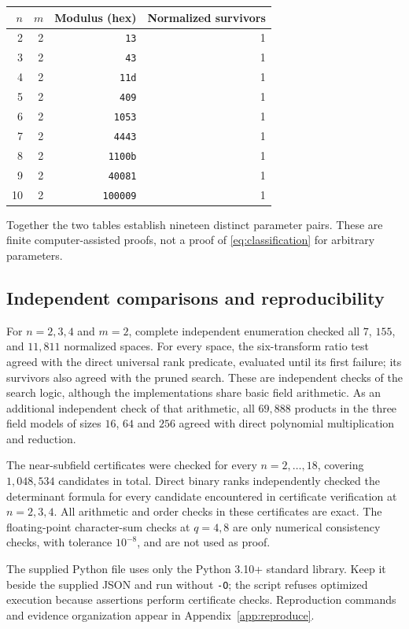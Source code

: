 \documentclass[11pt,a4paper]{article}
\theoremstyle{definition}\newtheorem{definition}[theorem]{Definition}
\theoremstyle{remark}\newtheorem{remark}[theorem]{Remark}
\numberwithin{equation}{section}
\begin{document}
\begin{center}\small
\begin{tabular}{rrrr}
\toprule
$n$&$m$&Modulus (hex)&Normalized survivors\\\midrule
2&2&\texttt{13}&1\\3&2&\texttt{43}&1\\4&2&\texttt{11d}&1\\5&2&\texttt{409}&1\\
6&2&\texttt{1053}&1\\7&2&\texttt{4443}&1\\8&2&\texttt{1100b}&1\\
9&2&\texttt{40081}&1\\10&2&\texttt{100009}&1\\\bottomrule
\end{tabular}
\end{center}
Together the two tables establish nineteen distinct parameter pairs. These are finite computer-assisted proofs, not a proof of \eqref{eq:classification} for arbitrary parameters.

\subsection{Independent comparisons and reproducibility}
For $n=2,3,4$ and $m=2$, complete independent enumeration checked all $7$, $155$, and $11,811$ normalized spaces. For every space, the six-transform ratio test agreed with the direct universal rank predicate, evaluated until its first failure; its survivors also agreed with the pruned search. These are independent checks of the search logic, although the implementations share basic field arithmetic. As an additional independent check of that arithmetic, all $69,888$ products in the three field models of sizes $16$, $64$ and $256$ agreed with direct polynomial multiplication and reduction.

The near-subfield certificates were checked for every $n=2,\ldots,18$, covering $1,048,534$ candidates in total. Direct binary ranks independently checked the determinant formula for every candidate encountered in certificate verification at $n=2,3,4$. All arithmetic and order checks in these certificates are exact. The floating-point character-sum checks at $q=4,8$ are only numerical consistency checks, with tolerance $10^{-8}$, and are not used as proof.

The supplied Python file uses only the Python 3.10+ standard library. Keep it beside the supplied JSON and run without \texttt{-O}; the script refuses optimized execution because assertions perform certificate checks. Reproduction commands and evidence organization appear in Appendix~\ref{app:reproduce}.
\end{document}

